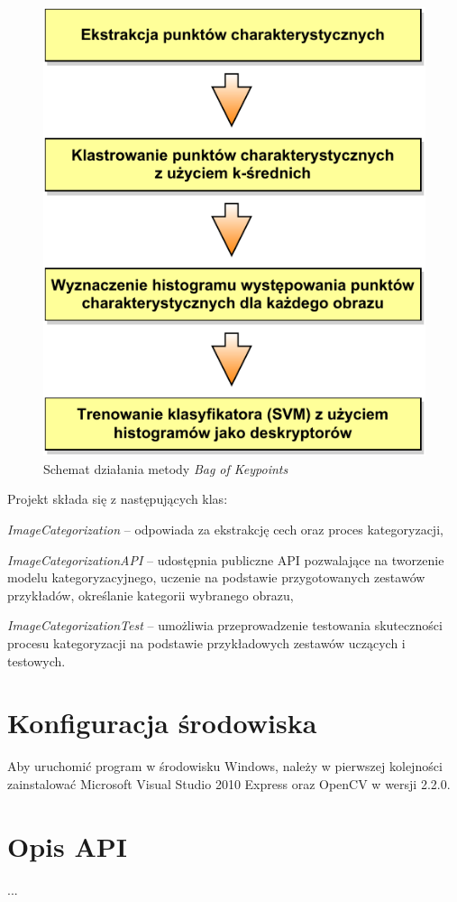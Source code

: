 \begin{figure}[h]
	\centering
	\includegraphics[scale=1.0]{graphics/03_implementacja/bag-of-keypoints.pdf}
	\caption{ Schemat działania metody \emph{Bag of Keypoints} }
	\label{fig:bag-of-keypoints}
\end{figure}

Projekt składa się z następujących klas:
\begin{compactitem}
	\item \emph{ImageCategorization} -- odpowiada za ekstrakcję cech oraz proces kategoryzacji, 
	\item \emph{ImageCategorizationAPI} -- udostępnia publiczne API pozwalające na tworzenie modelu kategoryzacyjnego, uczenie na podstawie przygotowanych zestawów przykładów, określanie kategorii wybranego obrazu,
	\item \emph{ImageCategorizationTest} -- umożliwia przeprowadzenie testowania skuteczności procesu kategoryzacji na podstawie przykładowych zestawów uczących i testowych.
\end{compactitem}

\section{Konfiguracja środowiska}
Aby uruchomić program w środowisku Windows, należy w pierwszej kolejności zainstalować Microsoft Visual Studio 2010 Express oraz OpenCV w wersji 2.2.0.


\section{Opis API}
...